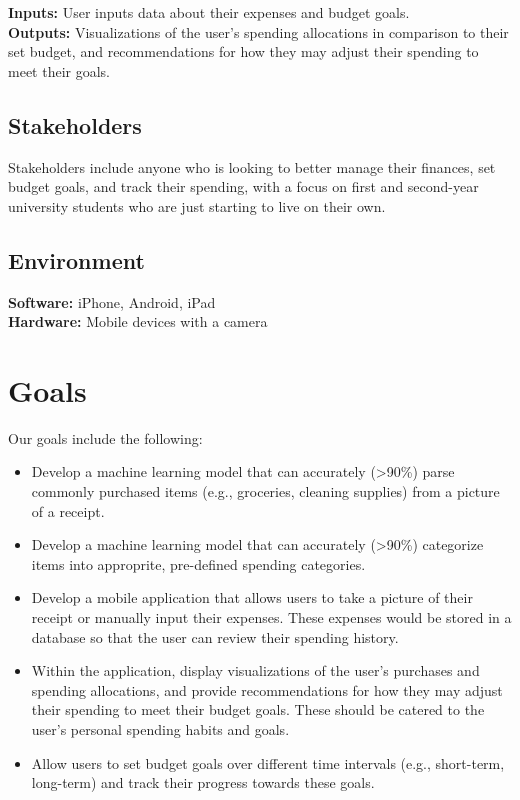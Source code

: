 \documentclass{article}
\begin{document}

\textbf{Inputs:} User inputs data about their expenses and budget goals.\\
\textbf{Outputs:} Visualizations of the user's spending allocations in comparison to their set budget, and recommendations for how they may adjust their spending to meet their goals.

\subsection{Stakeholders}

Stakeholders include anyone who is looking to better manage their finances, set budget goals, and track their spending, with a focus on first and second-year university students who are just starting to live on their own.

\subsection{Environment}


\textbf{Software:} iPhone, Android, iPad\\
\textbf{Hardware:} Mobile devices with a camera

\section{Goals}

Our goals include the following:
\begin{itemize}
    \item Develop a machine learning model that can accurately (\textgreater90\%) parse commonly purchased items (e.g., groceries, cleaning supplies) from a picture of a receipt.
    \item Develop a machine learning model that can accurately (\textgreater90\%) categorize items into approprite, pre-defined spending categories. 
    \item Develop a mobile application that allows users to take a picture of their receipt or manually input their expenses. These expenses would be stored in a database so that the user can review their spending history.
    \item Within the application, display visualizations of the user's purchases and spending allocations, and provide recommendations for how they may adjust their spending to meet their budget goals. These should be catered to the user's personal spending habits and goals.
    \item Allow users to set budget goals over different time intervals (e.g., short-term, long-term) and track their progress towards these goals.
\end{itemize}
\end{document}
